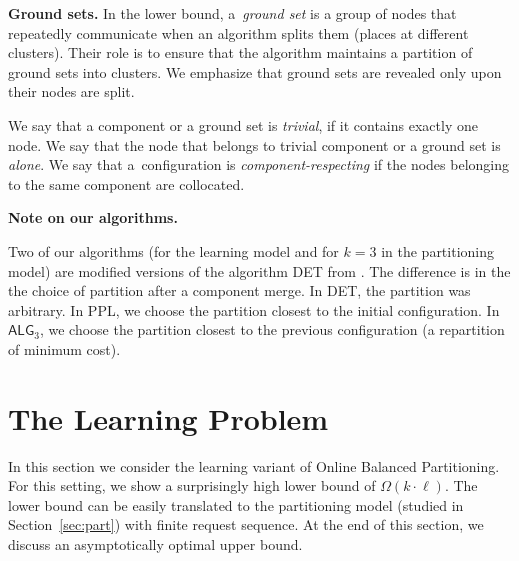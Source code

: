 \documentclass[manuscript,screen=true, review, anonymous]{acmart}
\newcommand{\TAlg}{{\ensuremath{\textsf{ALG}_{3}}}\xspace}
\newcommand\maciek[1]{}
\begin{document}
\noindent
\textbf{Ground sets.}
In the lower bound, a~\emph{ground set} is a group of nodes that repeatedly communicate when an algorithm splits them (places at different clusters).
Their role is to ensure that the algorithm maintains a partition of ground sets into clusters.
We emphasize that ground sets are revealed only upon their nodes are split.


We say that a component or a ground set is \emph{trivial}, if it contains exactly one node.
We say that the node that belongs to trivial component or a ground set is \emph{alone}.
We say that a~configuration is \emph{component-respecting}
if the nodes belonging to the same component are collocated.


\noindent
\textbf{Note on our algorithms.}
\maciek{Should not be here probably, but where?}
Two of our algorithms (for the learning model and for $k=3$ in the partitioning model) are modified versions of the algorithm DET from \cite{repartition-disc}.
The difference is in the the choice of partition after a component merge.
In DET, the partition was arbitrary.
In PPL, we choose the partition closest to the initial configuration.
In \TAlg, we choose the partition closest to the previous configuration (a repartition of minimum cost).

\section{The Learning Problem} %

In this section we consider the learning variant of Online Balanced Partitioning.
For this setting, we show a surprisingly high lower bound of $\Omega(k \cdot \ell)$.
The lower bound can be easily translated to the partitioning model (studied in Section~\ref{sec:part}) with finite request sequence.
At the end of this section, we discuss an asymptotically optimal upper bound.
\end{document}
